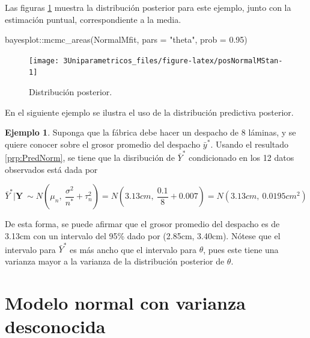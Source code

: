 \documentclass[
  10pt,
  spanish,
]{book}
\newenvironment{Shaded}{\begin{snugshade}}{\end{snugshade}}
\newcommand{\AttributeTok}[1]{\textcolor[rgb]{0.77,0.63,0.00}{#1}}
\newcommand{\FloatTok}[1]{\textcolor[rgb]{0.00,0.00,0.81}{#1}}
\newcommand{\FunctionTok}[1]{\textcolor[rgb]{0.00,0.00,0.00}{#1}}
\newcommand{\NormalTok}[1]{#1}
\newcommand{\SpecialCharTok}[1]{\textcolor[rgb]{0.00,0.00,0.00}{#1}}
\newcommand{\StringTok}[1]{\textcolor[rgb]{0.31,0.60,0.02}{#1}}
\theoremstyle{definition}
\theoremstyle{definition}
\newtheorem{example}{Ejemplo}[chapter]
\theoremstyle{definition}
\theoremstyle{definition}
\theoremstyle{remark}
\begin{document}
Las figuras \ref{fig:posNormalMStan} muestra la distribución posterior para este ejemplo, junto con la estimación puntual, correspondiente a la media.

\begin{Shaded}
\begin{Highlighting}[]
\NormalTok{bayesplot}\SpecialCharTok{::}\FunctionTok{mcmc\_areas}\NormalTok{(NormalMfit, }\AttributeTok{pars =} \StringTok{"theta"}\NormalTok{, }
                      \AttributeTok{prob =} \FloatTok{0.95}\NormalTok{)}
\end{Highlighting}
\end{Shaded}

\begin{figure}

{\centering \texttt{[image: 3Uniparametricos\_files/figure-latex/posNormalMStan-1]} 

}

\caption{Distribución posterior.}\label{fig:posNormalMStan}
\end{figure}

En el siguiente ejemplo se ilustra el uso de la distribución predictiva posterior.

\begin{example}
\protect\hypertarget{exm:unnamed-chunk-76}{}{\label{exm:unnamed-chunk-76} }Suponga que la fábrica debe hacer un despacho de 8 láminas, y se quiere conocer sobre el grosor promedio del despacho \(\bar{y}^*\). Usando el resultado \ref{prp:PredNorm}, se tiene que la disribución de \(\bar{Y}^*\) condicionado en los 12 datos observados está dada por

\begin{equation*}
\bar{Y}^*|\mathbf{Y}\ \sim N\left(\mu_n,\ \frac{\sigma^2}{n^*}+\tau^2_n\right) = N\left(3.13cm,\ \frac{0.1}{8}+0.007\right) = N(3.13cm,\ 0.0195cm^2)
\end{equation*}

De esta forma, se puede afirmar que el grosor promedio del despacho es de 3.13cm con un intervalo del 95\% dado por (2.85cm, 3.40cm). Nótese que el intervalo para \(\bar{Y}^{*}\) es más ancho que el intervalo para \(\theta\), pues este tiene una varianza mayor a la varianza de la distribución posterior de \(\theta\).
\end{example}

\hypertarget{modelo-normal-con-varianza-desconocida}{%
\section{Modelo normal con varianza desconocida}\label{modelo-normal-con-varianza-desconocida}}
\end{document}
